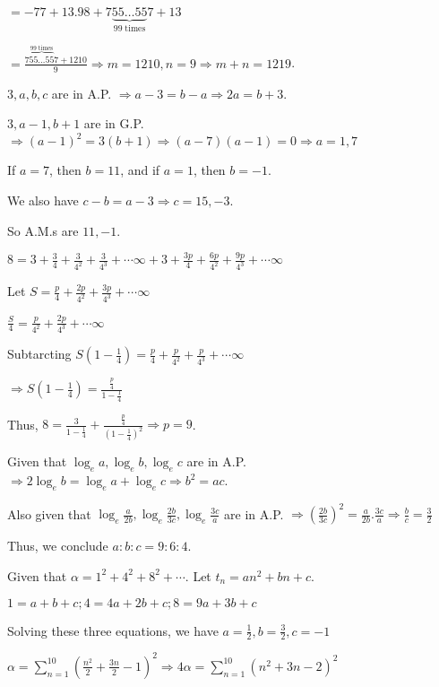   $= -77 + 13.98 + 7\underbrace{55\ldots55}_{99 \;\mathrm{times}}7 + 13$

  $= \frac{7\overbrace{55\ldots55}^{99 \;\mathrm{times}}7 + 1210}{9}\Rightarrow m = 1210, n = 9\Rightarrow m
  + n = 1219$.
\item $3, a, b, c$ are in A.P. $\Rightarrow a - 3 = b - a\Rightarrow 2a = b + 3$.

  $3, a - 1, b + 1$ are in G.P. $\Rightarrow (a - 1)^2 = 3(b + 1)\Rightarrow (a - 7)(a - 1) = 0\Rightarrow a
  = 1, 7$

  If $a = 7$, then $b = 11$, and if $a =1$, then $b = -1$.

  We also have $c - b = a - 3\Rightarrow c = 15, -3$.

  So A.M.s are $11, -1$.
\item $8 = 3 + \frac{3}{4} + \frac{3}{4^2} + \frac{3}{4^3} + \cdots \infty + 3 + \frac{3p}{4} +
  \frac{6p}{4^2} + \frac{9p}{4^3} + \cdots \infty$

  Let $S = \frac{p}{4} + \frac{2p}{4^2} + \frac{3p}{4^3} + \cdots \infty$

  $\frac{S}{4} = \frac{p}{4^2} + \frac{2p}{4^3} + \cdots \infty$

  Subtarcting $S\left(1 - \frac{1}{4}\right) = \frac{p}{4} + \frac{p}{4^2} + \frac{p}{4^3} + \cdots \infty$

  $\Rightarrow S\left(1 - \frac{1}{4}\right) = \frac{\frac{p}{4}}{1 - \frac{1}{4}}$

  Thus, $8 = \frac{3}{1 - \frac{1}{4}} + \frac{\frac{p}{4}}{\left(1 - \frac{1}{4}\right)^2}\Rightarrow p=
  9$.
\item Given that $\log_ea, \log_eb, \log_ec$ are in A.P. $\Rightarrow 2\log_eb = \log_ea + \log_ec
  \Rightarrow b^2 = ac$.

  Also given that $\log_e\frac{a}{2b}, \log_e\frac{2b}{3c}, \log_e\frac{3c}{a}$ are in A.P. $\Rightarrow
  \left(\frac{2b}{3c}\right)^2 = \frac{a}{2b}.\frac{3c}{a} \Rightarrow \frac{b}{c} = \frac{3}{2}$

  Thus, we conclude $a:b:c = 9:6:4$.
\item Given that $\alpha = 1^2 + 4^2 + 8^2 + \cdots$. Let $t_n = an^2 + bn + c$.

  $1 = a + b + c; 4 = 4a + 2b + c; 8 = 9a + 3b + c$

  Solving these three equations, we have $a = \frac{1}{2}, b = \frac{3}{2}, c = -1$

  $\alpha = \displaystyle\sum_{n = 1}^{10}\left(\frac{n^2}{2} + \frac{3n}{2} - 1\right)^2\Rightarrow 4\alpha
  = \sum_{n = 1}^{10}(n^2 + 3n - 2)^2$

